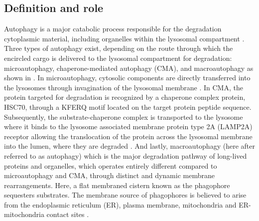 \subsection{Definition and role}
Autophagy is a major catabolic process responsible for the degradation cytoplasmic material, including organelles within the lysosomal compartment \citep{He2009,Nixon2011}. Three types of autophagy exist, depending on the route through which the encircled cargo is delivered to the lysosomal compartment for degradation: microautophagy, chaperone-mediated autophagy (CMA), and macroautophagy \citep{Boya2013} as shown in . In microautophagy, cytosolic components are directly transferred into the lysosomes through invagination of the lysosomal membrane \citep{Cai2012,Nixon2011}. In CMA, the protein targeted for degradation is recognized by a chaperone complex protein, HSC70, through a KFERQ motif located on the target protein peptide sequence. Subsequently, the substrate-chaperone complex is transported to the lysosome where it binds to the lysosome associated membrane protein type 2A (LAMP2A) receptor allowing the translocation of the protein across the lysosomal membrane into the lumen, where they are degraded \citep{Cuervo2014,Dice2007,Klionsky2010}. And lastly, macroautophagy (here after referred to as autophagy) which is the major degradation pathway of long-lived proteins and organelles, which operates entirely different compared to microautophagy and CMA, through distinct and dynamic membrane rearrangements. Here, a flat membraned cistern known as the phagophore sequesters substrates. The membrane source of phagophores is believed to arise from the  endoplasmic reticulum (ER), plasma membrane, mitochondria and ER-mitochondria contact sites \citep{Hailey2010,Hamasaki2013,Hayashi-Nishino2009,Ravikumar2010,sarkar2013,Yla-Anttila2009}.
